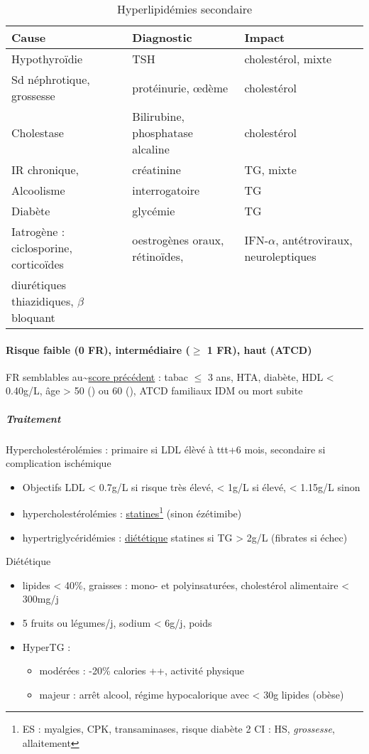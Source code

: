 \documentclass[11pt]{article}
\begin{document}
\begin{table}[htbp]
\caption{\label{tab:orgd545a93}
Hyperlipidémies secondaire}
\centering
\begin{tabular}{lll}
Cause & Diagnostic & Impact\\
\hline
Hypothyroïdie & TSH & cholestérol, mixte\\
Sd néphrotique, grossesse & protéinurie, \oe{}dème & cholestérol\\
Cholestase & Bilirubine, phosphatase alcaline & cholestérol\\
IR chronique, & créatinine & TG, mixte\\
Alcoolisme & interrogatoire & TG\\
Diabète & glycémie & TG\\
\hline
Iatrogène : ciclosporine, corticoïdes & oestrogènes oraux, rétinoïdes, & IFN-\(\alpha\), antétroviraux, neuroleptiques\\
diurétiques thiazidiques, \(\beta\)bloquant &  & \\
\end{tabular}
\end{table}

\paragraph{Risque faible (0 FR), intermédiaire (\(\ge\) 1 FR), haut (ATCD)}
\label{sec:org14c7f28}

FR semblables au\textasciitilde{}\hyperref[subsec:fr]{score précédent} : tabac \(\le\) 3 ans, HTA, diabète, HDL < 0.40g/L, âge > 50
(\male) ou 60 (\female), ATCD familiaux IDM ou mort subite

\subparagraph{Traitement}
\label{sec:org7b2ef30}
Hypercholestérolémies : primaire si LDL élèvé à ttt+6 mois, secondaire si complication ischémique
\begin{itemize}
\item Objectifs LDL < 0.7g/L si risque très élevé, < 1g/L si élevé, < 1.15g/L sinon
\item hypercholestérolémies : \uline{statines}\footnote{ES : myalgies, \inc CPK, \inc transaminases, \inc risque diabète 2
CI : HS, \emph{grossesse}, allaitement} (sinon ézétimibe)
\item hypertriglycéridémies : \uline{diététique} \textpm{} statines si TG > 2g/L (fibrates si échec)
\end{itemize}

Diététique
\begin{itemize}
\item lipides < 40\%, graisses : mono- et polyinsaturées, cholestérol alimentaire < 300mg/j
\item 5 fruits ou légumes/j, sodium < 6g/j, \dec poids
\item HyperTG : 
\begin{itemize}
\item modérées : -20\% calories ++, \inc activité physique
\item majeur : arrêt alcool, régime hypocalorique avec < 30g lipides (obèse)
\end{itemize}
\end{itemize}
\end{document}
